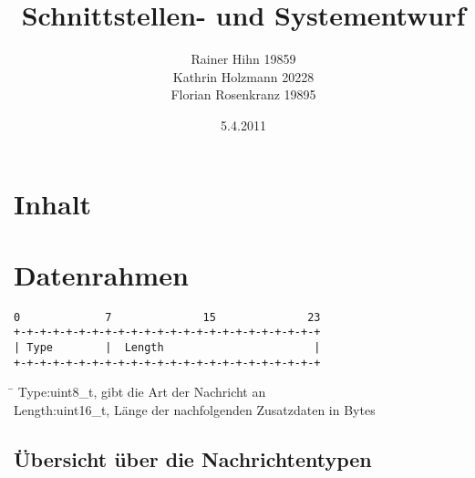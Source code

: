 \documentclass[a4paper,10pt]{article}
\title{Schnittstellen- und Systementwurf}
\author{Rainer Hihn 19859\\Kathrin Holzmann 20228\\Florian Rosenkranz 19895}
\date{5.4.2011}
\begin{document}
\maketitle
\newpage


\section{Inhalt}

\tableofcontents

\newpage

\section{Datenrahmen}

\begin{Verbatim}[fontfamily=courier]
0             7              15              23
+-+-+-+-+-+-+-+-+-+-+-+-+-+-+-+-+-+-+-+-+-+-+-+
| Type        |  Length                       |
+-+-+-+-+-+-+-+-+-+-+-+-+-+-+-+-+-+-+-+-+-+-+-+
\end{Verbatim}

\begin{tabbing}
 \hspace{2 cm}\=\kill
Type:\>uint8\_t, gibt die Art der Nachricht an\\
Length:\>uint16\_t, Länge der nachfolgenden Zusatzdaten in Bytes
\end{tabbing}

\subsection{Übersicht über die Nachrichtentypen}
\end{document}
